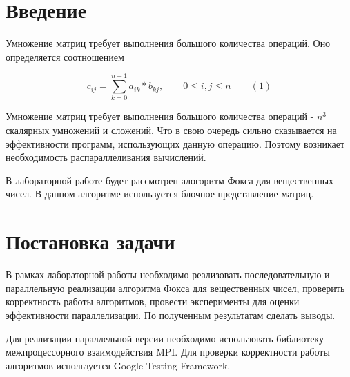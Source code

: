 \documentclass{report}
\begin{document}
\setcounter{page}{2}

\tableofcontents
\newpage

\section*{Введение}
Умножение матриц требует выполнения большого количества операций.  Оно определяется соотношением
\par$$
    c_{ij} = \sum_{k=0}^{n-1} a_{ik} * b_{kj},\qquad 0 \le i,j \le n \qquad (1)
    $$

Умножение матриц требует выполнения большого количества операций - $n^3$ скалярных умножений и сложений. Что в свою очередь сильно сказывается на эффективности программ, использующих данную операцию. Поэтому возникает необходимость распараллеливания вычислений.
\par В лабораторной работе будет рассмотрен алогоритм Фокса для вещественных чисел. В данном алгоритме используется блочное представление матриц.

\newpage

\section*{Постановка задачи}
В рамках лабораторной работы необходимо реализовать последовательную и параллельную реализации алгоритма Фокса для вещественных чисел, проверить корректность работы алгоритмов, провести эксперименты для оценки эффективности параллелизации. По полученным результатам сделать выводы.
\par Для реализации параллельной версии необходимо использовать библиотеку межпроцессорного взаимодействия MPI. Для проверки корректности работы алгоритмов используется Google Testing Framework.
\newpage

\end{document}
